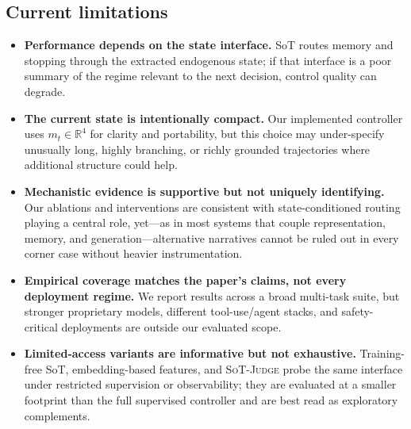 \subsection{Current limitations}
\begin{itemize}[leftmargin=1.6em]
    \item \textbf{Performance depends on the state interface.}
    SoT routes memory and stopping through the extracted endogenous state; if that interface is a poor summary of the regime relevant to the next decision, control quality can degrade.

    \item \textbf{The current state is intentionally compact.}
    Our implemented controller uses \(m_t\in\mathbb{R}^{4}\) for clarity and portability, but this choice may under-specify unusually long, highly branching, or richly grounded trajectories where additional structure could help.

    \item \textbf{Mechanistic evidence is supportive but not uniquely identifying.}
    Our ablations and interventions are consistent with state-conditioned routing playing a central role, yet---as in most systems that couple representation, memory, and generation---alternative narratives cannot be ruled out in every corner case without heavier instrumentation.

    \item \textbf{Empirical coverage matches the paper's claims, not every deployment regime.}
    We report results across a broad multi-task suite, but stronger proprietary models, different tool-use/agent stacks, and safety-critical deployments are outside our evaluated scope.

    \item \textbf{Limited-access variants are informative but not exhaustive.}
    Training-free SoT, embedding-based features, and \textsc{SoT-Judge} probe the same interface under restricted supervision or observability; they are evaluated at a smaller footprint than the full supervised controller and are best read as exploratory complements.
\end{itemize}

